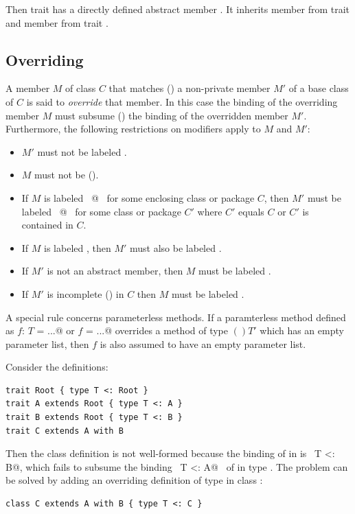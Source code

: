 Then trait  has a directly defined abstract member . It
inherits member  from trait  and member  from
trait .

\subsection{Overriding}
\label{sec:overriding}


A member $M$ of class $C$ that matches () 
a non-private member $M'$ of a
base class of $C$ is said to {\em override} that member.  In this case
the binding of the overriding member $M$ must subsume
() the binding of the overridden member $M'$.
Furthermore, the following restrictions on modifiers apply to $M$ and
$M'$:
\begin{itemize}
\item
$M'$ must not be labeled .
\item
$M$ must not be  ().
\item
If $M$ is labeled ~\lstinline@private[$C$]@~ for some enclosing class or package $C$,
then $M'$ must be labeled ~\lstinline@private[$C'$]@~ for some class or package $C'$ where
$C'$ equals $C$ or $C'$ is contained in $C$.
\item
If $M$ is labeled , then $M'$ must also be
labeled .
\item
If $M'$ is not an abstract member, then
$M$ must be labeled .
\item
If $M'$ is incomplete () in $C$ then $M$ must be
labeled .
\end{itemize}
A special rule concerns parameterless methods. If a paramterless
method defined as \lstinline@def $f$: $T$ = ...@ or 
\lstinline@def $f$ = ...@ overrides a method of
type $()T'$ which has an empty parameter list, then $f$ is also
assumed to have an empty parameter list.

\example\label{ex:compound-a}
Consider the definitions:
\begin{lstlisting}
trait Root { type T <: Root }
trait A extends Root { type T <: A }
trait B extends Root { type T <: B }
trait C extends A with B 
\end{lstlisting}
Then the class definition  is not well-formed because the
binding of  in  is
~\lstinline@type T <: B@,
which fails to subsume the binding ~\lstinline@type T <: A@~ of 
in type . The problem can be solved by adding an overriding 
definition of type  in class :
\begin{lstlisting}
class C extends A with B { type T <: C }
\end{lstlisting}

